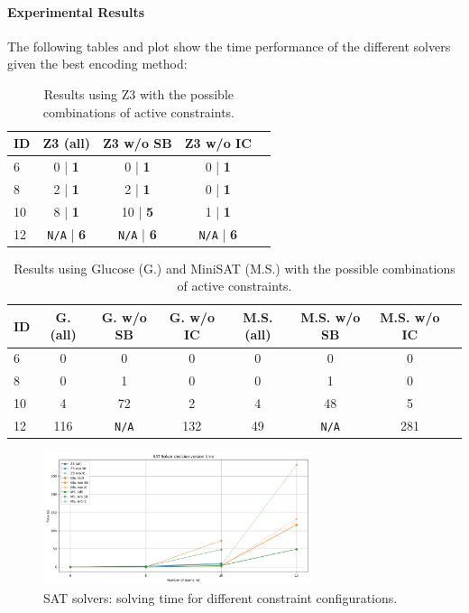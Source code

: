 \documentclass[11pt]{article}
\begin{document}
\paragraph{Experimental Results} The following tables and plot show the time performance of the different solvers given the best encoding method:
\begin{table}[H]
\centering
\small
\label{tab:z3}
\begin{tabular}{@{}lcccc@{}}
\toprule
ID & Z3 (all) & Z3 w/o SB & Z3 w/o IC \\
\midrule
6 & 0 | \textbf{1} & 0 | \textbf{1} & 0 | \textbf{1} \\
8 & 2 | \textbf{1} & 2 | \textbf{1} & 0 | \textbf{1}  \\
10 & 8 | \textbf{1} & 10 | \textbf{5} & 1 | \textbf{1} \\
12 & \texttt{N/A} | \textbf{6} & \texttt{N/A} | \textbf{6} & \texttt{N/A} | \textbf{6} \\
\bottomrule
\end{tabular}
\caption{Results using Z3 with the possible combinations of active constraints.}
\end{table}

\begin{table}[H]
\centering
\small
\label{tab:glucosems}
\begin{tabular}{@{}lccccccc@{}}
\toprule
ID & G. (all) & G. w/o SB & G. w/o IC & M.S. (all) & M.S. w/o SB & M.S. w/o IC\\
\midrule
6 & 0 & 0 & 0 & 0 & 0 & 0\\
8 & 0 & 1 & 0 & 0 & 1 & 0 \\
10 & 4 & 72 & 2 & 4 & 48 & 5\\
12 & 116 & \texttt{N/A} & 132 & 49 & \texttt{N/A} & 281\\
\bottomrule
\end{tabular}
\caption{Results using Glucose (G.) and MiniSAT (M.S.) with the possible combinations of active constraints.}
\end{table}

\begin{figure}[H]
    \centering
    \includegraphics[width=0.7\textwidth]{sat_plot.png}
    \caption{SAT solvers: solving time for different constraint configurations.}
    \label{fig:sat_plot}
\end{figure}
\end{document}

